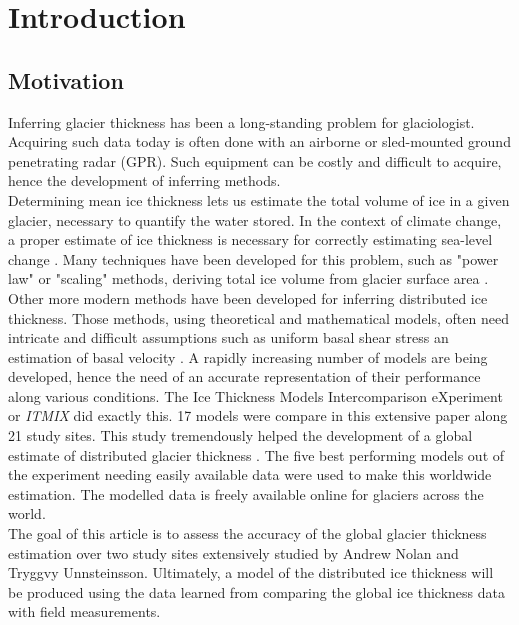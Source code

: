 \documentclass[a4, 12pt]{article}
\begin{document}
\section{Introduction}
\subsection{Motivation}
Inferring glacier thickness has been a long-standing problem for glaciologist. Acquiring such data today is often done with an airborne or sled-mounted ground penetrating radar (GPR). Such equipment can be costly and difficult to acquire, hence the development of inferring methods.\\

Determining mean ice thickness lets us estimate the total volume of ice in a given glacier, necessary to quantify the water stored. In the context of climate change, a proper estimate of ice thickness is necessary for correctly estimating sea-level change \cite{farinotti2016accurate}. Many techniques have been developed for this problem, such as "power law" or "scaling" methods, deriving total ice volume from glacier surface area \cite{bahr2015review}. Other more modern methods have been developed for inferring distributed ice thickness. Those methods, using theoretical and mathematical models, often need intricate and difficult assumptions such as uniform basal shear stress an estimation of basal velocity \cite{farinotti2016accurate}. A rapidly increasing number of models are being developed, hence the need of an accurate representation of their performance along various conditions. The Ice Thickness Models Intercomparison eXperiment \cite{farinotti2016accurate} or \textit{ITMIX} did exactly this. 17 models were compare in this extensive paper along 21 study sites. This study tremendously helped the development of a global estimate of distributed glacier thickness \cite{farinotti2019consensus}. The five best performing models out of the experiment needing easily available data were used to make this worldwide estimation. The modelled data is freely available online for glaciers across the world.\\

The goal of this article is to assess the accuracy of the global glacier thickness estimation over two study sites extensively studied by Andrew Nolan and Tryggvy Unnsteinsson. Ultimately, a model of the distributed ice thickness will be produced using the data learned from comparing the global ice thickness data with field measurements.
\end{document}
